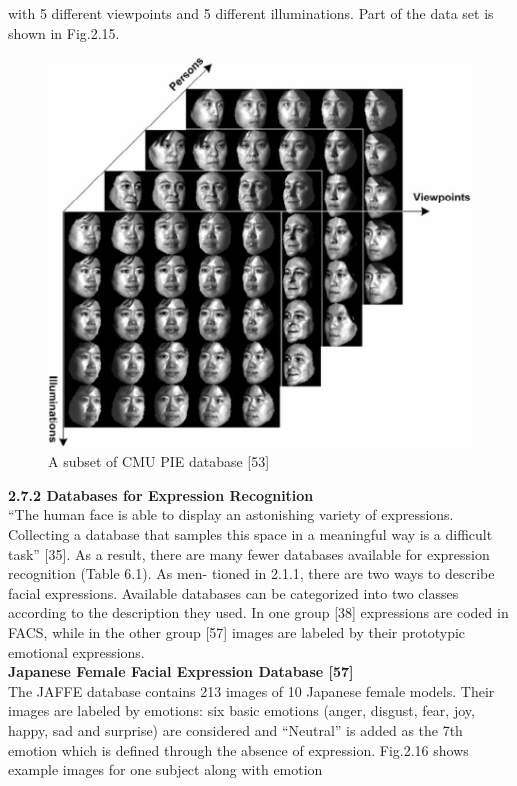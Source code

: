 \documentclass[12pt]{report}
\begin{document}
	
	
	\pagebreak
	
	\noindent with 5 different viewpoints and 5 different illuminations. Part of the data set is shown in
	Fig.2.15.
	
	\begin{figure}[h]
		\centering
		\includegraphics[scale=0.3]{img/fig_2-15.png}
		\caption{A subset of CMU PIE database [53]}
	\end{figure}
	\vspace{0.5cm}
	
	\noindent \textbf{\large 2.7.2 Databases for Expression Recognition} \vspace{0.3cm} \\
	``The human face is able to display an astonishing variety of expressions. Collecting a
	database that samples this space in a meaningful way is a difficult task'' [35]. As a result,
	there are many fewer databases available for expression recognition (Table 6.1). As men-
	tioned in 2.1.1, there are two ways to describe facial expressions. Available databases can
	be categorized into two classes according to the description they used. In one group [38]
	expressions are coded in FACS, while in the other group [57] images are labeled by their
	prototypic emotional expressions.
	\vspace{0.1cm} \\
	
	\noindent \textbf{Japanese Female Facial Expression Database [57]}
	\vspace{0.3cm} \\
	The JAFFE database contains 213 images of 10 Japanese female models. Their images are
	labeled by emotions: six basic emotions (anger, disgust, fear, joy, happy, sad and surprise)
	are considered and “Neutral” is added as the 7th emotion which is defined through the
	absence of expression. Fig.2.16 shows example images for one subject along with emotion
	
\end{document}

